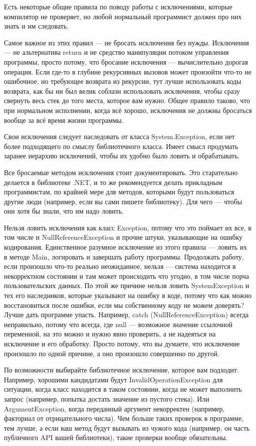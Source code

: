 \documentclass{../../text-style}
\begin{document}
Есть некоторые общие правила по поводу работы с исключениями, которые компилятор не проверяет, но любой нормальный программист должен про них знать и им следовать.

Самое важное из этих правил --- не бросать исключения без нужды. Исключения --- не альтернатива return и не средство манипуляции потоком управления программы, просто потому, что бросание исключения --- вычислительно дорогая операция. Если где-то в глубине рекурсивных вызовов может произойти что-то не ошибочное, но требующее возврата из рекурсии, тут лучше использовать коды возврата, как бы ни был велик соблазн использовать исключения, чтобы сразу свернуть весь стек до того места, которое вам нужно. Общее правило таково, что при нормальном исполнении, когда всё хорошо, исключения не должны бросаться вообще за всё время жизни программы.

Свои исключения следует наследовать от класса System.Exception, если нет более подходящего по смыслу библиотечного класса. Имеет смысл продумать заранее иерархию исключений, чтобы их удобно было ловить и обрабатывать.

Все бросаемые методом исключения стоит документировать. Это старательно делается в библиотеке .NET, и то же рекомендуется делать прикладным программистам, по крайней мере для методов, которыми будут пользоваться другие люди (например, если вы сами пишете библиотеку). Для чего --- чтобы они хотя бы знали, что им надо ловить.

Нельзя ловить исключения как класс Exception, потому что это поймает их все, в том числе и NullReferenceException и прочие штуки, указывающие на ошибку кодирования. Единственное разумное исключение из этого правила --- ловить их в методе Main, логировать и завершать работу программы. Продолжать работу, если произошло что-то реально неожиданное, нельзя --- система находится в некорректном состоянии и там может происходить что угодно, в том числе порча пользовательских данных. По этой же причине нельзя ловить SystemException и тех его наследников, которые указывают на ошибку в коде, потому что как можно восстановиться после ошибки, если мы собственному коду не можем доверять? Лучше дать программе упасть. Например, catch (NullReferenceException) всегда неправильно, потому что всегда, где null --- возможное значение ссылочной переменной, на это можно и нужно явно проверить, а не надеяться на исключение и его обработку. Просто потому, что вы думаете, что исключение произошло по одной причине, а оно произошло совершенно по другой.

По возможности выбирайте библиотечное исключение, которое вам подходит. Например, хорошими кандидатами будут InvalidOperationException для ситуации, когда класс находится в таком состоянии, когда не может выполнить запрос (например, попытка достать значение из пустого стека). Или ArgumentException, когда переданный аргумент некорректен (например, факториал от отрицательного числа). Чем больше таких проверок в программе, тем лучше, а если ваш метод будут вызывать из чужого кода (например, он часть публичного API вашей библиотеки), такие проверки вообще обязательны.
\end{document}

